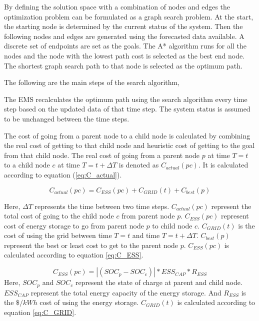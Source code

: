 By defining the solution space with a combination of nodes and edges the optimization problem can be formulated as a graph search problem. At the start, the starting node is determined by the current status of the system. Then the following nodes and edges are generated using the forecasted data available. A discrete set of endpoints are set as the goals. The A*  algorithm runs for all the nodes and the node with the lowest path cost is selected as the best end node. The shortest graph search path to that node is selected as the optimum path.

The following are the main steps of the search algorithm,


The EMS recalculates the optimum path using the search algorithm every time step based on the updated data of that time step. The system status is assumed to be unchanged between the time steps.

The cost of going from a parent node to a child node is calculated by combining the real cost of getting to that child node and heuristic cost of getting to the goal from that child node. The real cost of going from a parent node $p$ at time $T=t$ to a child node $c$ at time $T=t+\Delta T$ is denoted as $C_{actual}(pc)$. It is calculated according to equation (\ref{eq:C_actual}).

\begin{equation}
\label{eq:C_actual}
    C_{actual}(pc) =  C_{ESS}(pc)+C_{GRID}(t)+C_{best}(p)
\end{equation}

Here, $\Delta T$ represents the time between two time steps. $C_{actual}(pc)$ represent the total cost of going to the child node $c$ from parent node $p$. $C_{ESS}(pc)$ represent cost of energy storage to go from parent node $p$ to child node $c$. $C_{GRID}(t)$ is the cost of using the grid between time $T=t$ and time $T=t+\Delta T$. $C_{best}(p)$ represent the best or least cost to get to the parent node $p$. $C_{ESS}(pc)$ is calculated according to equation \ref{eq:C_ESS}.

\begin{equation}
\label{eq:C_ESS}
C_{ESS}(pc) = |(SOC_p - SOC_c)|*ESS_{CAP}*R_{ESS} 
\end{equation}
Here, $SOC_p$ and $SOC_c$ represent the state of charge at parent and child node. $ESS_{CAP}$ represent the total energy capacity of the energy storage. And $R_{ESS}$ is the $\$/kWh$ cost of using the energy storage. $C_{GRID}(t)$ is calculated according to equation \ref{eq:C_GRID}.

